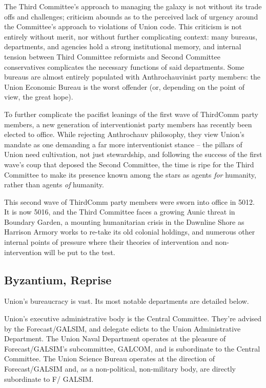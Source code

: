 The Third Committee’s approach to managing the galaxy is not without its trade offs and
challenges; criticism abounds as to the perceived lack of urgency around the Committee’s
approach to violations of Union code. This criticism is not entirely without merit, nor without further
complicating context: many bureaus, departments, and agencies hold a strong institutional
memory, and internal tension between Third Committee reformists and Second Committee
conservatives complicates the necessary functions of said departments. Some bureaus are
almost entirely populated with Anthrochauvinist party members: the Union Economic Bureau is
the worst offender (or, depending on the point of view, the great hope).

To further complicate the pacifist leanings of the first wave of ThirdComm party members, a new
generation of interventionist party members has recently been elected to office. While rejecting
Anthrochauv philosophy, they view Union’s mandate as one demanding a far more interventionist
stance -- the pillars of Union need cultivation, not just stewardship, and following the success of
the first wave’s coup that deposed the Second Committee, the time is ripe for the Third
Committee to make its presence known among the stars as agents \textit{for} humanity, rather than
agents \textit{of} humanity.

This second wave of ThirdComm party members were sworn into office in 5012. It is now 5016,
and the Third Committee faces a growing Aunic threat in Boundary Garden, a mounting
humanitarian crisis in the Dawnline Shore as Harrison Armory works to re-take its old colonial
holdings, and numerous other internal points of pressure where their theories of intervention and
non-intervention will be put to the test.

\subsection{Byzantium, Reprise }

Union’s bureaucracy is vast. Its most notable departments are detailed below.

Union’s executive administrative body is the Central Committee. They’re advised by the
Forecast/GALSIM, and delegate edicts to the Union Administrative Department. The Union Naval
Department operates at the pleasure of Forecast/GALSIM’s subcommittee, GALCOM, and is
subordinate to the Central Committee. The Union Science Bureau operates at the direction of
Forecast/GALSIM and, as a non-political, non-military body, are directly subordinate to F/
GALSIM.

